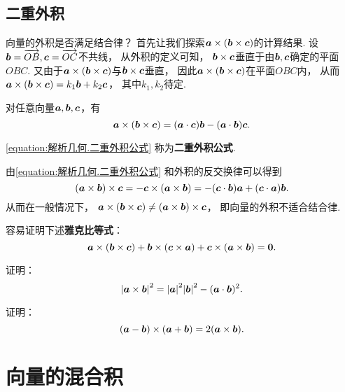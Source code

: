 \subsection{二重外积}
向量的外积是否满足结合律？
首先让我们探索\(\boldsymbol{a}\times(\boldsymbol{b}\times\boldsymbol{c})\)的计算结果.
设\(\boldsymbol{b}=\overrightarrow{OB},\boldsymbol{c}=\overrightarrow{OC}\)不共线，
从外积的定义可知，
\(\boldsymbol{b}\times\boldsymbol{c}\)垂直于由\(\boldsymbol{b},\boldsymbol{c}\)确定的平面\(OBC\).
又由于\(\boldsymbol{a}\times(\boldsymbol{b}\times\boldsymbol{c})\)与\(\boldsymbol{b}\times\boldsymbol{c}\)垂直，
因此\(\boldsymbol{a}\times(\boldsymbol{b}\times\boldsymbol{c})\)在平面\(OBC\)内，
从而\(\boldsymbol{a}\times(\boldsymbol{b}\times\boldsymbol{c}) = k_1 \boldsymbol{b} + k_2 \boldsymbol{c}\)，
其中\(k_1,k_2\)待定.

\begin{theorem}
对任意向量\(\boldsymbol{a},\boldsymbol{b},\boldsymbol{c}\)，有
\begin{equation}\label{equation:解析几何.二重外积公式}
	\boldsymbol{a}\times(\boldsymbol{b}\times\boldsymbol{c})
	= (\boldsymbol{a}\cdot\boldsymbol{c}) \boldsymbol{b}
	- (\boldsymbol{a}\cdot\boldsymbol{b}) \boldsymbol{c}.
\end{equation}
\end{theorem}
\cref{equation:解析几何.二重外积公式}
称为\textbf{二重外积公式}.

由\cref{equation:解析几何.二重外积公式}
和外积的反交换律可以得到\[
	(\boldsymbol{a}\times\boldsymbol{b})\times\boldsymbol{c}
	= -\boldsymbol{c}\times(\boldsymbol{a}\times\boldsymbol{b})
	= -(\boldsymbol{c}\cdot\boldsymbol{b}) \boldsymbol{a}
	+ (\boldsymbol{c}\cdot\boldsymbol{a}) \boldsymbol{b}.
\]
从而在一般情况下，
\(\boldsymbol{a}\times(\boldsymbol{b}\times\boldsymbol{c}) \neq (\boldsymbol{a}\times\boldsymbol{b})\times\boldsymbol{c}\)，
即向量的外积不适合结合律.

容易证明下述\textbf{雅克比等式}：
\begin{equation}\label{equation:解析几何.雅可比等式}
	\boldsymbol{a}\times(\boldsymbol{b}\times\boldsymbol{c})
	+ \boldsymbol{b}\times(\boldsymbol{c}\times\boldsymbol{a})
	+ \boldsymbol{c}\times(\boldsymbol{a}\times\boldsymbol{b})
	= \boldsymbol{0}.
\end{equation}

\begin{example}
证明：\[
	\abs{\boldsymbol{a}\times\boldsymbol{b}}^2
	= \abs{\boldsymbol{a}}^2 \abs{\boldsymbol{b}}^2 - (\boldsymbol{a}\cdot\boldsymbol{b})^2.
\]
\end{example}

\begin{example}
证明：\[
	(\boldsymbol{a}-\boldsymbol{b})\times(\boldsymbol{a}+\boldsymbol{b})
	= 2(\boldsymbol{a}\times\boldsymbol{b}).
\]
\end{example}

\section{向量的混合积}
